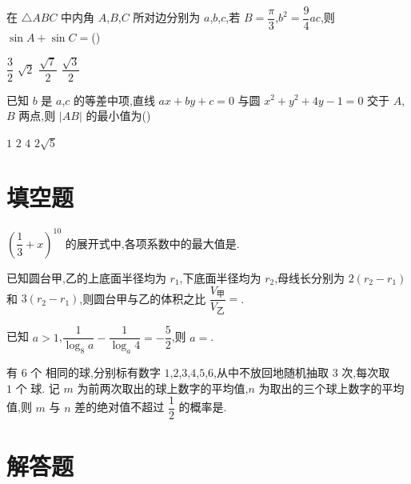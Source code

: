 \begin{problem}
在 \( \triangle ABC \) 中内角 \(A\),\(B\),\(C\) 所对边分别为 \(a\),\(b\),\(c\),若 \( B=\dfrac{\pi}{3} \),\( b^2=\dfrac{9}{4}ac \),则 \( \sin A+\sin C= \)(\quad)

\choices
    {\( \dfrac{3}{2} \)}
    {\( \sqrt{2} \)}
    {\( \dfrac{\sqrt{7}}{2} \)}
    {\( \dfrac{\sqrt{3}}{2} \)}
\end{problem}

\begin{problem}
已知 \( b \) 是 \(a\),\(c\) 的等差中项,直线 \( ax+by+c=0 \) 与圆 \( x^2+y^2+4y-1=0 \) 交于 \(A\),\(B\) 两点,则 \( \left| AB \right| \) 的最小值为(\quad)

\choices
    {\( 1 \)}
    {\( 2 \)}
    {\( 4 \)}
    {\( 2\sqrt{5} \)}
\end{problem}

\section{填空题}

\begin{problem}
\( \left( \dfrac{1}{3}+x \right)^{10} \) 的展开式中,各项系数中的最大值是\fillinblank{}.
\end{problem}

\begin{problem}
已知圆台甲,乙的上底面半径均为 \( r_1 \),下底面半径均为 \( r_2 \),母线长分别为 \( 2\left( r_2-r_1 \right) \) 和 \( 3\left( r_2-r_1 \right) \),则圆台甲与乙的体积之比 \( \dfrac{V_{\text{甲}}}{V_{\text{乙}}}= \)\fillinblank{}.
\end{problem}

\begin{problem}
已知 \( a>1 \),\( \dfrac{1}{\log_8 a}-\dfrac{1}{\log_a 4}=-\dfrac{5}{2} \),则 \( a= \)\fillinblank{}.
\end{problem}

\begin{problem}
有 \( 6\text{ 个} \) 相同的球,分别标有数字 \(1\),\(2\),\(3\),\(4\),\(5\),\(6\),从中不放回地随机抽取 \( 3\text{ 次} \),每次取 \( 1\text{ 个} \) 球. 记 \( m \) 为前两次取出的球上数字的平均值,\( n \) 为取出的三个球上数字的平均值,则 \( m \) 与 \( n \) 差的绝对值不超过 \( \dfrac{1}{2} \) 的概率是\fillinblank{}.
\end{problem}

\section{解答题}

